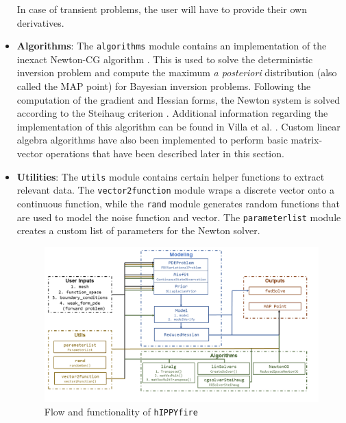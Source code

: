 \begin{itemize}
\begin{enumerate}
    \end{enumerate}  
    In case of transient problems, the user will have to provide their own derivatives.
    \item \textbf{Algorithms}: The \texttt{algorithms} module contains an implementation of the inexact Newton-CG algorithm \cite{borzi2011computational}. This is used to solve the deterministic inversion problem and compute the maximum \textit{a posteriori} distribution (also called the MAP point) for Bayesian inversion problems. Following the computation of the gradient and Hessian forms, the Newton system is solved according to the Steihaug criterion \cite{steihaug1983local}. Additional information regarding the implementation of this algorithm can be found in Villa et al. \cite{Villa2020}.  Custom linear algebra algorithms have also been implemented to perform basic matrix-vector operations that have been described later in this section.
    \item \textbf{Utilities}: The \texttt{utils} module contains certain helper functions to extract relevant data. The \texttt{vector2function} module wraps a discrete vector onto a continuous function, while the \texttt{rand} module generates random functions that are used to model the noise function and vector. The \texttt{parameterlist} module creates a custom list of parameters for the Newton solver.

    \begin{figure}[th]
        \centering
        \includegraphics[width=1.0\textwidth]{figures/hIPPYfire.png}
        \caption{Flow and functionality of \texttt{hIPPYfire}}
        \label{figure:hippyfire}
    \end{figure}
    

\end{itemize}
